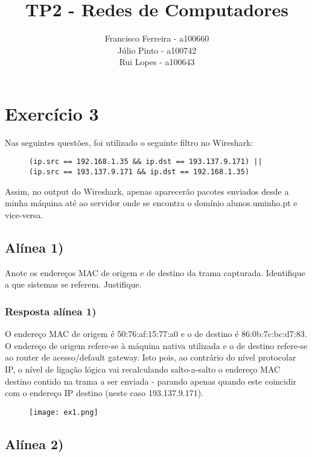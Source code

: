 \documentclass{article}
\title{TP2 - Redes de Computadores}
\author{Francisco Ferreira - a100660\\Júlio Pinto - a100742\\Rui Lopes - a100643}
\begin{document}
\maketitle
\tableofcontents

\pagebreak
\bigskip

\section{Exercício 3}

Nas seguintes questões, foi utilizado o seguinte filtro no Wireshark:

\begin{figure}[h]
    \lstinline{(ip.src == 192.168.1.35 && ip.dst == 193.137.9.171) || (ip.src == 193.137.9.171 && ip.dst == 192.168.1.35)}
\end{figure}
 \noindent Assim, no output do Wireshark, apenas aparecerão pacotes enviados desde a minha máquina até ao servidor onde se encontra o domínio alunos.uminho.pt e vice-versa.

\subsection{Alínea 1)}

Anote os endereços MAC de origem e de destino da trama capturada. Identifique a que sistemas se referem. Justifique.


\subsubsection{Resposta alínea 1)}

O endereço MAC de origem é 50:76:af:15:77:a0 e o de destino é 86:0b:7c:bc:d7:83. O endereço de origem refere-se à máquina nativa utilizada e o de destino refere-se ao router de acesso/default gateway. Isto pois, ao contrário do nível protocolar IP, o nível de ligação lógica vai recalculando salto-a-salto o endereço MAC destino contido na trama a ser enviada - parando apenas quando este coincidir com o endereço IP destino (neste caso 193.137.9.171).

\begin{figure}[h!]
    \centering
    \texttt{[image: ex1.png]}
\end{figure}

\subsection{Alínea 2)}
\end{document}
